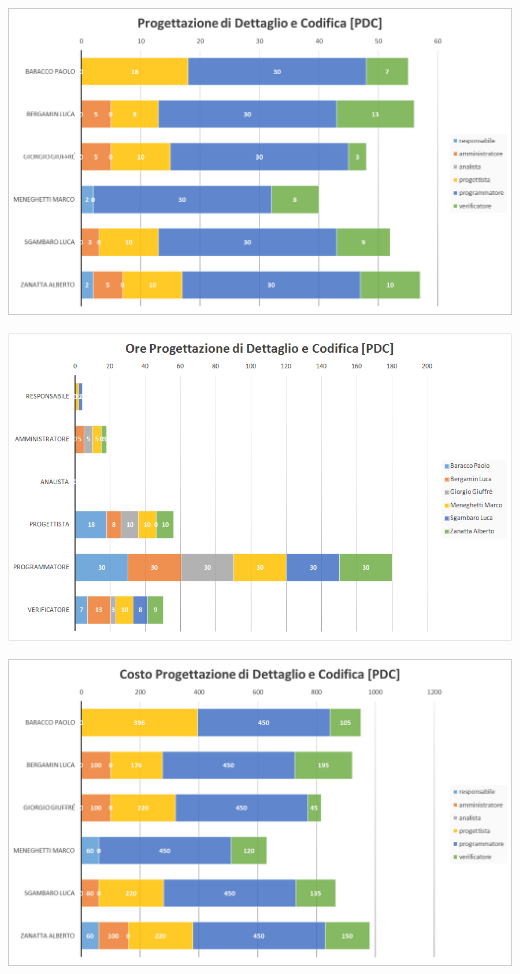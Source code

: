 	{\includegraphics[width=15cm]{img/orepdc1.png}\par}

	{\includegraphics[width=15cm]{img/orepdc2.png}\par}

	{\includegraphics[width=15cm]{img/costopdc.png}\par}



